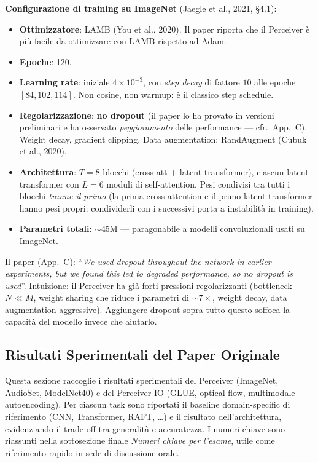 \documentclass[
  11pt,
]{article}
\begin{document}
\textbf{Configurazione di training su ImageNet} (Jaegle et al., 2021, \S4.1):
\begin{itemize}
\item \textbf{Ottimizzatore}: LAMB (You et al., 2020). Il paper riporta che il Perceiver è più facile da ottimizzare con LAMB rispetto ad Adam.
\item \textbf{Epoche}: 120.
\item \textbf{Learning rate}: iniziale $4 \times 10^{-3}$, con \emph{step decay} di fattore $10$ alle epoche $[84, 102, 114]$. Non cosine, non warmup: è il classico step schedule.
\item \textbf{Regolarizzazione}: \textbf{no dropout} (il paper lo ha provato in versioni preliminari e ha osservato \emph{peggioramento} delle performance --- cfr.\ App.\ C). Weight decay, gradient clipping. Data augmentation: RandAugment (Cubuk et al., 2020).
\item \textbf{Architettura}: $T = 8$ blocchi (cross-att + latent transformer), ciascun latent transformer con $L = 6$ moduli di self-attention. Pesi condivisi tra tutti i blocchi \emph{tranne il primo} (la prima cross-attention e il primo latent transformer hanno pesi propri: condividerli con i successivi porta a instabilità in training).
\item \textbf{Parametri totali}: $\sim$45M --- paragonabile a modelli convoluzionali usati su ImageNet.
\end{itemize}

\begin{notabox}[title={\textbf{Perché no dropout?}}]
Il paper (App.\ C): ``\emph{We used dropout throughout the network in earlier experiments, but we found this led to degraded performance, so no dropout is used}''. Intuizione: il Perceiver ha già forti pressioni regolarizzanti (bottleneck $N \ll M$, weight sharing che riduce i parametri di $\sim7\times$, weight decay, data augmentation aggressive). Aggiungere dropout sopra tutto questo soffoca la capacità del modello invece che aiutarlo.
\end{notabox}

\subsection{Risultati Sperimentali del Paper Originale}
\label{sec:results}

Questa sezione raccoglie i risultati sperimentali del Perceiver (ImageNet, AudioSet, ModelNet40) e del Perceiver IO (GLUE, optical flow, multimodale autoencoding). Per ciascun task sono riportati il baseline domain-specific di riferimento (CNN, Transformer, RAFT, \ldots) e il risultato dell'architettura, evidenziando il trade-off tra generalità e accuratezza. I numeri chiave sono riassunti nella sottosezione finale \emph{Numeri chiave per l'esame}, utile come riferimento rapido in sede di discussione orale.
\end{document}
